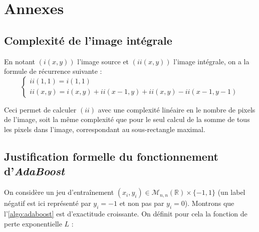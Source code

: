 \documentclass[12pt,a4paper]{article}
\begin{document}
\newpage

\section{Annexes}
%

\subsection{Complexité de l'image intégrale}
En notant $(i(x, y))$ l'image source et $(ii(x, y))$ l'image intégrale, on a la formule de récurrence suivante :
\begin{equation}
    \begin{cases}
        ii(1, 1) = i(1, 1) \\
        ii(x, y) = i(x, y) + ii(x-1, y) + ii(x, y) - ii(x-1, y-1)
    \end{cases}
\end{equation}

Ceci permet de calculer $(ii)$ avec une complexité linéaire en le nombre de pixels de l'image, soit la même complexité que pour le seul calcul de la somme de tous les pixels dans l'image, correspondant au sous-rectangle maximal.

\subsection{Justification formelle du fonctionnement d'\textit{AdaBoost}}
\label{sec:preuve-boost}
On considère un jeu d'entraînement $(x_i, y_i) \in \mathscr{M}_{n, n}(\mathbb{R})\times \{-1, 1\}$ (un label négatif est ici représenté par $y_i = -1$ et non pas par $y_i = 0$). Montrons que l'\autoref{algo:adaboost} est d'exactitude croissante. On définit pour cela la fonction de perte exponentielle $L$ \cite{wang} :
\end{document}
